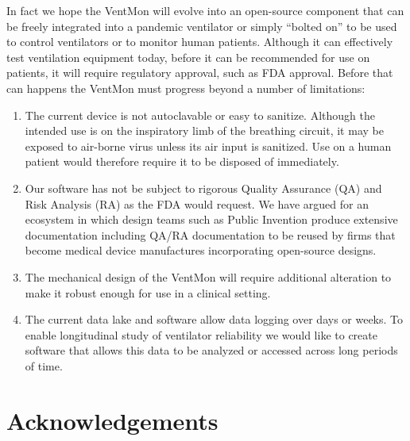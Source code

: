 \documentclass[11pt, letterpaper]{article}
\begin{document}
In fact we hope the VentMon will evolve into an open-source component that can be freely integrated into a pandemic ventilator or simply ``bolted on'' to be used to control ventilators or to monitor human patients. Although it can effectively test ventilation equipment today, before it can be recommended for use on patients, it will require regulatory approval, such as FDA approval. Before that can happens the VentMon must progress beyond a number of limitations:
\begin{enumerate}
\item The current device is not autoclavable or easy to sanitize. Although the intended use is on the
  inspiratory limb of the breathing circuit, it may be exposed to air-borne virus unless its air input
  is sanitized. Use on a human patient would therefore require it to be disposed of immediately.
\item Our software has not be subject to rigorous Quality Assurance (QA) and Risk Analysis (RA) as the FDA would request. We have argued\cite{ecosystem} for an ecosystem in which design teams such as Public Invention produce extensive documentation including  QA/RA documentation to be reused by firms that become medical device manufactures incorporating open-source designs.
\item The mechanical design of the VentMon will require additional alteration to make it robust enough for use in a clinical setting.
\item The current data lake and software allow data  logging over days or weeks. To enable longitudinal study of ventilator reliability we would like to create software that allows this data to be analyzed or accessed across long periods of time.
\end{enumerate}



\section{Acknowledgements}
\end{document}
